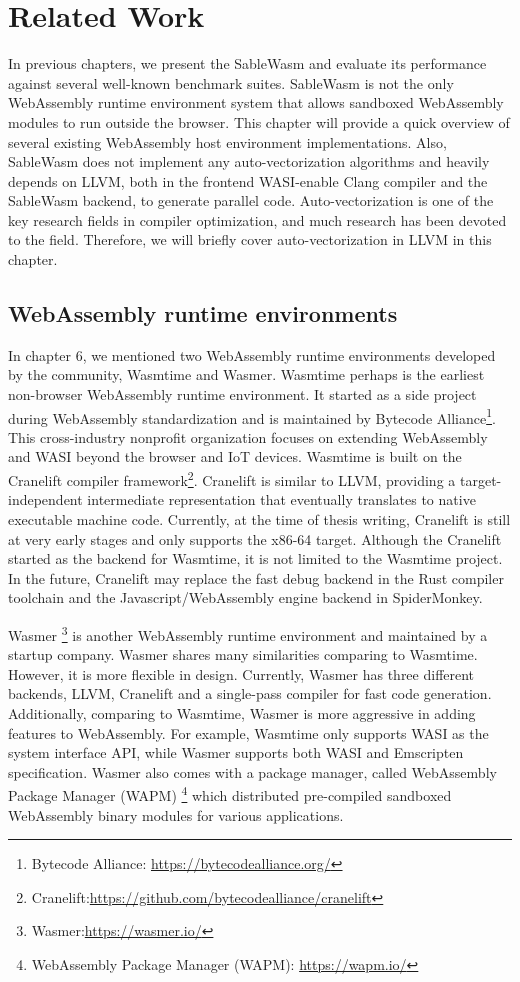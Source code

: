 \chapter{Related Work}

In previous chapters, we present the SableWasm and evaluate its performance against several well-known benchmark suites. SableWasm is not the only WebAssembly runtime environment system that allows sandboxed WebAssembly modules to run outside the browser. This chapter will provide a quick overview of several existing WebAssembly host environment implementations. Also, SableWasm does not implement any auto-vectorization algorithms and heavily depends on LLVM, both in the frontend WASI-enable Clang compiler and the SableWasm backend, to generate parallel code. Auto-vectorization is one of the key research fields in compiler optimization, and much research has been devoted to the field. Therefore, we will briefly cover auto-vectorization in LLVM in this chapter.

\section*{WebAssembly runtime environments}

In chapter 6, we mentioned two WebAssembly runtime environments developed by the community, Wasmtime and Wasmer. Wasmtime perhaps is the earliest non-browser WebAssembly runtime environment. It started as a side project during WebAssembly standardization and is maintained by Bytecode Alliance\footnote{Bytecode Alliance: \url{https://bytecodealliance.org/}}. This cross-industry nonprofit organization focuses on extending WebAssembly and WASI beyond the browser and IoT devices. Wasmtime is built on the Cranelift compiler framework\footnote{Cranelift:\url{https://github.com/bytecodealliance/cranelift}}. Cranelift is similar to LLVM, providing a target-independent intermediate representation that eventually translates to native executable machine code. Currently, at the time of thesis writing, Cranelift is still at very early stages and only supports the x86-64 target. Although the Cranelift started as the backend for Wasmtime, it is not limited to the Wasmtime project. In the future, Cranelift may replace the fast debug backend in the Rust compiler toolchain and the Javascript/WebAssembly engine backend in SpiderMonkey.

Wasmer \footnote{Wasmer:\url{https://wasmer.io/}} is another WebAssembly runtime environment and maintained by a startup company. Wasmer shares many similarities comparing to Wasmtime. However, it is more flexible in design. Currently, Wasmer has three different backends, LLVM, Cranelift and a single-pass compiler for fast code generation. Additionally, comparing to Wasmtime, Wasmer is more aggressive in adding features to WebAssembly. For example, Wasmtime only supports WASI as the system interface API, while Wasmer supports both WASI and Emscripten specification. Wasmer also comes with a package manager, called WebAssembly Package Manager (WAPM) \footnote{WebAssembly Package Manager (WAPM): \url{https://wapm.io/}} which distributed pre-compiled sandboxed WebAssembly binary modules for various applications.

